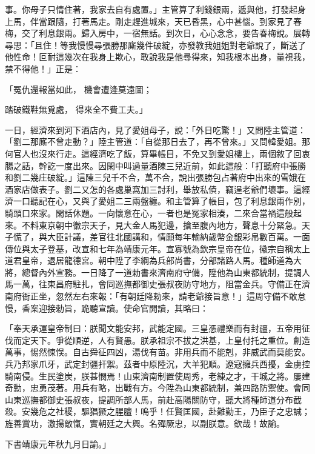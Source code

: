 事。你母子只情住著，我家去自有處置。」主管算了利錢銀兩，遞與他，打發起身上馬，伴當跟隨，打著馬走。剛走趕進城來，天已昏黑，心中甚惱。到家見了春梅，交了利息銀兩。歸入房中，一宿無話。到次日，心心念念，要告春梅說。展轉尋思：「且住！等我慢慢尋張勝那廝幾件破綻，亦發教我姐姐對老爺說了，斷送了他性命！叵耐這幾次在我身上欺心，敢說我是他尋得來，知我根本出身，量視我，禁不得他！」正是：

「冤仇還報當如此，  機會遭逄莫遠圖；

踏破鐵鞋無覓處，  得來全不費工夫。」

一日，經濟來到河下酒店內，見了愛姐母子，說：「外日吃驚！」又問陸主管道：「劉二那廝不曾走動？」陸主管道：「自從那日去了，再不曾來。」又問韓愛姐。那何官人也沒來行走。這經濟吃了飯，算畢帳目，不免又到愛姐樓上，兩個敘了回衷腸之話，幹訖一度出來。因閑中叫過量酒陳三兒近前，如此這般：「打聽府中張勝和劉二幾庄破綻。」這陳三兒千不合，萬不合，說出張勝包占著府中出來的雪娥在酒家店做表子。劉二又怎的各處巢窩加三討利，舉放私債，竊逞老爺們壞事。這經濟一口聽記在心，又與了愛姐二三兩盤纏。和主管算了帳目，包了利息銀兩作別，騎頭口來家。閑話休題。一向懷意在心，一者也是冤家相湊，二來合當禍這般起來。不料東京朝中徽宗天子，見大金人馬犯邊，搶至腹內地方，聲息十分緊急。天子慌了，與大臣計議，差官往北國講和，情願每年輸納歲幣金銀彩帛數百萬。一面傳位與太子登基，改宣和七年為靖康元年。宣寡號為欽宗皇帝在位，徽宗自稱太上道君皇帝，退居龍德宮。朝中陞了李綱為兵部尚書，分部諸路人馬。種師道為大將，總督內外宣務。一日降了一道勅書來濟南府守備，陞他為山東都統制，提調人馬一萬，往東昌府駐扎，會同巡撫都御史張叔夜防守地方，阻當金兵。守備正在濟南府衙正坐，忽然左右來報：「有朝廷降勅來，請老爺接旨意！」這周守備不敢怠慢，香案迎接勅旨，跪聽宣讀。使命官開讀，其略曰：

「奉天承運皇帝制曰：朕聞文能安邦，武能定國。三皇憑禮樂而有封疆，五帝用征伐而定天下。爭從順逆，人有賢愚。朕承祖宗不拔之洪基，上皇付托之重位。創造萬事，惕然悚悮。自古舜征四凶，湯伐有苗。非用兵而不能剋，非威武而莫能安。兵乃邦家爪牙，武定封疆扞禦。茲者中原陸沉，大羊犯順。遼寇擁兵西擾，金虜控騎南侵。生民塗炭，朕甚憫焉！山東濟南制置使周秀，老練之才，干城之將。屢建奇勳，忠勇茂著。用兵有略，出戰有方。今陞為山東都統制，兼四路防禦使。會同山東巡撫都御史張叔夜，提調所部人馬，前赴高陽關防守，聽大將種師道分布截殺。安幾危之社稷，驅猖獗之腥膻！嗚乎！任賢匡國，赴難勤王，乃臣子之忠誠；旌善賞功，激揚敵愾，實朝廷之大興。名殫厥忠，以副朕意。欽哉！故諭。

下書靖康元年秋九月日諭。」


